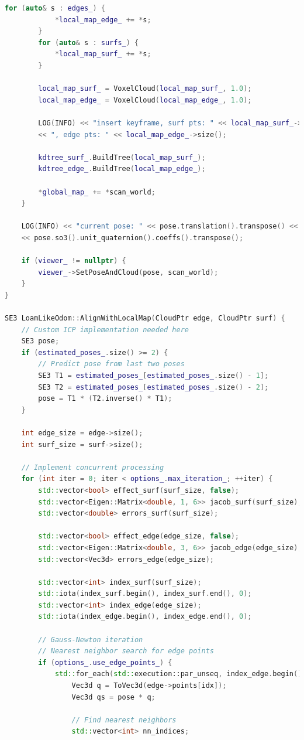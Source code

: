 \begin{lstlisting}[language=c++,caption=src/ch7/loam-like/loam\_like\_odom.cc]
		for (auto& s : edges_) {
			*local_map_edge_ += *s;
		}
		for (auto& s : surfs_) {
			*local_map_surf_ += *s;
		}
		
		local_map_surf_ = VoxelCloud(local_map_surf_, 1.0);
		local_map_edge_ = VoxelCloud(local_map_edge_, 1.0);
		
		LOG(INFO) << "insert keyframe, surf pts: " << local_map_surf_->size()
		<< ", edge pts: " << local_map_edge_->size();
		
		kdtree_surf_.BuildTree(local_map_surf_);
		kdtree_edge_.BuildTree(local_map_edge_);
		
		*global_map_ += *scan_world;
	}
	
	LOG(INFO) << "current pose: " << pose.translation().transpose() << ", "
	<< pose.so3().unit_quaternion().coeffs().transpose();
	
	if (viewer_ != nullptr) {
		viewer_->SetPoseAndCloud(pose, scan_world);
	}
}

SE3 LoamLikeOdom::AlignWithLocalMap(CloudPtr edge, CloudPtr surf) {
	// Custom ICP implementation needed here
	SE3 pose;
	if (estimated_poses_.size() >= 2) {
		// Predict pose from last two poses
		SE3 T1 = estimated_poses_[estimated_poses_.size() - 1];
		SE3 T2 = estimated_poses_[estimated_poses_.size() - 2];
		pose = T1 * (T2.inverse() * T1);
	}
	
	int edge_size = edge->size();
	int surf_size = surf->size();
	
	// Implement concurrent processing
	for (int iter = 0; iter < options_.max_iteration_; ++iter) {
		std::vector<bool> effect_surf(surf_size, false);
		std::vector<Eigen::Matrix<double, 1, 6>> jacob_surf(surf_size);  // 1D residual for planes
		std::vector<double> errors_surf(surf_size);
		
		std::vector<bool> effect_edge(edge_size, false);
		std::vector<Eigen::Matrix<double, 3, 6>> jacob_edge(edge_size);  // 3D residual for edges
		std::vector<Vec3d> errors_edge(edge_size);
		
		std::vector<int> index_surf(surf_size);
		std::iota(index_surf.begin(), index_surf.end(), 0);
		std::vector<int> index_edge(edge_size);
		std::iota(index_edge.begin(), index_edge.end(), 0);
		
		// Gauss-Newton iteration
		// Nearest neighbor search for edge points
		if (options_.use_edge_points_) {
			std::for_each(std::execution::par_unseq, index_edge.begin(), index_edge.end(), [&](int idx) {
				Vec3d q = ToVec3d(edge->points[idx]);
				Vec3d qs = pose * q;
				
				// Find nearest neighbors
				std::vector<int> nn_indices;
				

\end{lstlisting}
